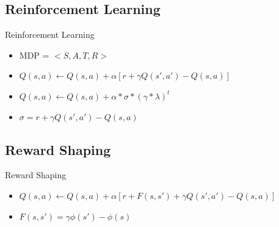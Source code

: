 \documentclass{bredelebeamer}
\begin{document}
\subsection{Reinforcement Learning}
\begin{frame}{Reinforcement Learning}

\begin{block}{}
\begin{itemize}
\item MDP =  $< S, A, T, R >$
\item $Q(s, a) \leftarrow  Q(s, a) +  \alpha [r + \gamma Q(s', a') - Q(s,a)]$
\item $Q(s, a) \leftarrow  Q(s, a) +  \alpha *  \sigma *  (\gamma * \lambda)^t$
\item $\sigma = r + \gamma Q(s', a') - Q(s,a)$
\end{itemize}
\end{block}

\end{frame}

\subsection{Reward Shaping}
\begin{frame}{Reward Shaping}

\begin{block}{}
\begin{itemize}
\item $Q(s, a) \leftarrow  Q(s, a) +  \alpha [r + F(s, s') + \gamma Q(s', a') - Q(s,a)]$
\item $F(s, s') =\gamma \phi (s') - \phi (s)$
\end{itemize}
\end{block}

\end{frame}
\end{document}
